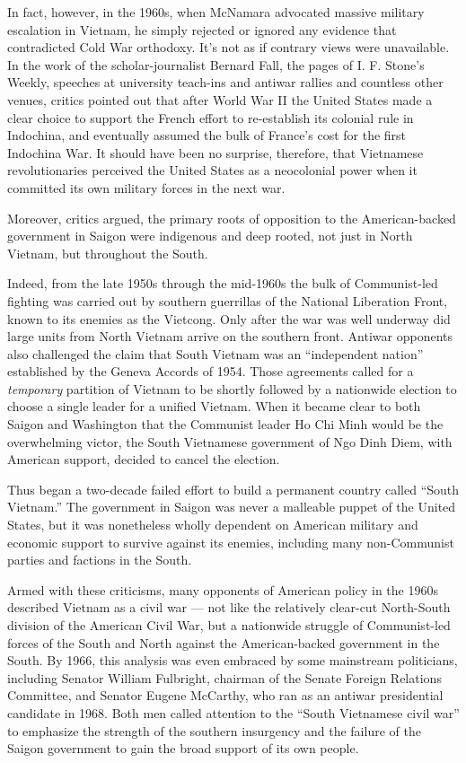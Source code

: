 In fact, however, in the 1960s, when McNamara advocated massive military
escalation in Vietnam, he simply rejected or ignored any evidence that
contradicted Cold War orthodoxy. It's not as if contrary views were
unavailable. In the work of the scholar-journalist Bernard Fall, the
pages of I. F. Stone's Weekly, speeches at university teach-ins and
antiwar rallies and countless other venues, critics pointed out that
after World War II the United States made a clear choice to support the
French effort to re-establish its colonial rule in Indochina, and
eventually assumed the bulk of France's cost for the first Indochina
War. It should have been no surprise, therefore, that Vietnamese
revolutionaries perceived the United States as a neocolonial power when
it committed its own military forces in the next war.

Moreover, critics argued, the primary roots of opposition to the
American-backed government in Saigon were indigenous and deep rooted,
not just in North Vietnam, but throughout the South.

Indeed, from the late 1950s through the mid-1960s the bulk of
Communist-led fighting was carried out by southern guerrillas of the
National Liberation Front, known to its enemies as the Vietcong. Only
after the war was well underway did large units from North Vietnam
arrive on the southern front. Antiwar opponents also challenged the
claim that South Vietnam was an ``independent nation'' established by
the Geneva Accords of 1954. Those agreements called for a
\emph{temporary} partition of Vietnam to be shortly followed by a
nationwide election to choose a single leader for a unified Vietnam.
When it became clear to both Saigon and Washington that the Communist
leader Ho Chi Minh would be the overwhelming victor, the South
Vietnamese government of Ngo Dinh Diem, with American support, decided
to cancel the election.

Thus began a two-decade failed effort to build a permanent country
called ``South Vietnam.'' The government in Saigon was never a malleable
puppet of the United States, but it was nonetheless wholly dependent on
American military and economic support to survive against its enemies,
including many non-Communist parties and factions in the South.

Armed with these criticisms, many opponents of American policy in the
1960s described Vietnam as a civil war --- not like the relatively
clear-cut North-South division of the American Civil War, but a
nationwide struggle of Communist-led forces of the South and North
against the American-backed government in the South. By 1966, this
analysis was even embraced by some mainstream politicians, including
Senator William Fulbright, chairman of the Senate Foreign Relations
Committee, and Senator Eugene McCarthy, who ran as an antiwar
presidential candidate in 1968. Both men called attention to the ``South
Vietnamese civil war'' to emphasize the strength of the southern
insurgency and the failure of the Saigon government to gain the broad
support of its own people.


